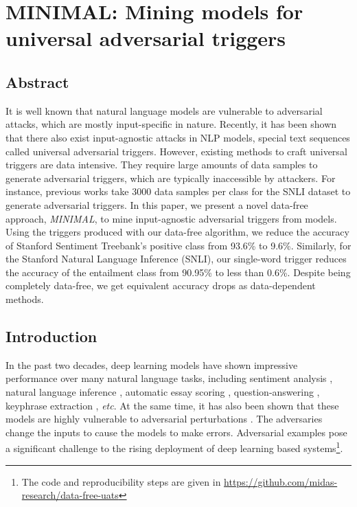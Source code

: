 \section{MINIMAL: Mining models for universal adversarial triggers}
\label{MINIMAL: Mining models for universal adversarial triggers}
\subsection{Abstract}
It is well known that natural language models are vulnerable to adversarial attacks, which are mostly input-specific in nature. Recently, it has been shown that there also exist input-agnostic attacks in NLP models, special text sequences called universal adversarial triggers. However, existing methods to craft universal triggers are data intensive. They require large amounts of data samples to generate adversarial triggers, which are typically inaccessible by attackers. For instance, previous works take 3000 data samples per class for the SNLI dataset to generate adversarial triggers. In this paper, we present a novel data-free approach, \textit{MINIMAL}, to mine input-agnostic adversarial triggers from models. Using the triggers produced with our data-free algorithm, we reduce the accuracy of Stanford Sentiment Treebank's positive class from 93.6\% to 9.6\%. Similarly, for the Stanford Natural Language Inference (SNLI), our single-word trigger reduces the accuracy of the entailment class from 90.95\% to less than 0.6\%. Despite being completely data-free, we get equivalent accuracy drops as data-dependent methods. %





\subsection{Introduction}
\label{sec:introduction-UAT}
In the past two decades, deep learning models have shown impressive performance over many natural language tasks, including sentiment analysis \cite{zhang2018deep}, natural language inference \cite{parikh2016decomposable}, automatic essay scoring \cite{kumar2019get}, question-answering \cite{xiong2016dynamic}, keyphrase extraction \cite{meng2017deep}, \textit{etc}. At the same time, it has also been shown that these models are highly vulnerable to adversarial perturbations \cite{behjati2019universal}. The adversaries change the inputs to cause the models to make errors. Adversarial examples pose a significant challenge to the rising deployment of deep learning based systems\footnote{The code and reproducibility steps are given in \url{https://github.com/midas-research/data-free-uats}}.


